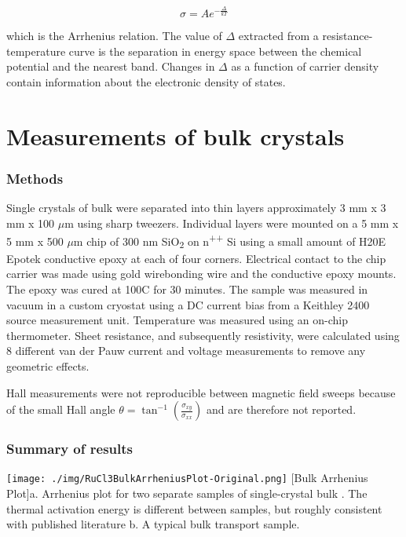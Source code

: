 \begin{equation}
\sigma = A e^{-\frac{\Delta}{kT}}
\end{equation}

which is the Arrhenius relation. The value of $\Delta$ extracted from a resistance-temperature curve is the separation in energy space between the chemical potential and the nearest band. Changes in $\Delta$ as a function of carrier density contain information about the electronic density of states.


\section{Measurements of \texorpdfstring{\rucl}{RuCl3}bulk crystals}

\subsubsection{Methods}
Single crystals of bulk \rucl were separated into thin layers approximately 3 mm x 3 mm x 100 $\mu$m using sharp tweezers. Individual layers were mounted on a 5 mm x 5 mm x 500 $\mu$m chip of 300 nm SiO\textsubscript{2} on n\textsuperscript{++} Si using a small amount of H20E Epotek conductive epoxy at each of four corners. Electrical contact to the chip carrier was made using gold wirebonding wire and the conductive epoxy mounts. The epoxy was cured at 100\degree C for 30 minutes. The sample was measured in vacuum in a custom cryostat using a DC current bias from a Keithley 2400 source measurement unit. Temperature was measured using an on-chip thermometer. Sheet resistance, and subsequently resistivity, were calculated using 8 different van der Pauw current and voltage measurements to remove any geometric effects.

Hall measurements were not reproducible between magnetic field sweeps because of the small Hall angle $\theta = \tan^{-1} \left( \frac{\sigma_{xy}}{\sigma_{xx}} \right)$ and are therefore not reported.

\subsubsection{Summary of results}

\begin{centering}
\texttt{[image: ./img/RuCl3BulkArrheniusPlot-Original.png]}
  \captionsetup{width=0.75\textwidth}
  [Bulk \rucl Arrhenius Plot]{a. Arrhenius plot for two separate samples of single-crystal bulk \ruclnospace . The thermal activation energy is different between samples, but roughly consistent with published literature b. A typical bulk \rucl transport sample.} 
  \label{fig:ElecTransBulk-01}
\end{centering}

